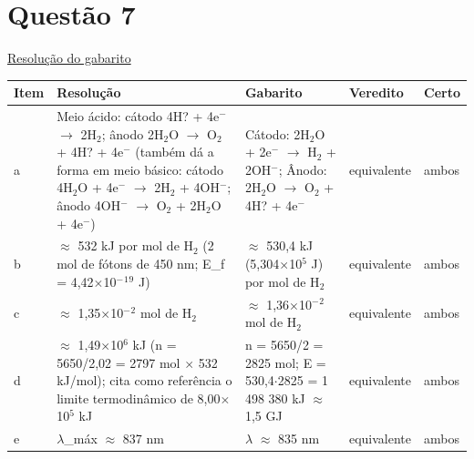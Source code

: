 \documentclass{article}%
\begin{document}
\section*{Questão 7}%
\href{https://poliedroresolve.sistemapoliedro.com.br/vestibulares/ita/2026/ita-2-fase-dia-2-29-10-2025-2-fase-dia-2/dissertativa-7-quimica-2-fase-dia-2-ita-2026}{Resolução do gabarito}\par\smallskip%
\begin{longtable}{@{}p{} p{} p{} p{} p{}@{}}\toprule Item & Resolução & Gabarito & Veredito & Certo \\ \midrule
a & Meio ácido: cátodo 4H? + 4e$^{-}$ $\to$ 2H$_{2}$; ânodo 2H$_{2}$O $\to$ O$_{2}$ + 4H? + 4e$^{-}$ (também dá a forma em meio básico: cátodo 4H$_{2}$O + 4e$^{-}$ $\to$ 2H$_{2}$ + 4OH$^{-}$; ânodo 4OH$^{-}$ $\to$ O$_{2}$ + 2H$_{2}$O + 4e$^{-}$) & Cátodo: 2H$_{2}$O + 2e$^{-}$ $\to$ H$_{2}$ + 2OH$^{-}$; Ânodo: 2H$_{2}$O $\to$ O$_{2}$ + 4H? + 4e$^{-}$ & equivalente & ambos \\
b & $\approx$ 532 kJ por mol de H$_{2}$ (2 mol de fótons de 450 nm; E\_f = 4,42$\times$10$^{-}$$^{1}$$^{9}$ J) & $\approx$ 530,4 kJ (5,304$\times$10$^{5}$ J) por mol de H$_{2}$ & equivalente & ambos \\
c & $\approx$ 1,35$\times$10$^{-}$$^2$ mol de H$_{2}$ & $\approx$ 1,36$\times$10$^{-}$$^2$ mol de H$_{2}$ & equivalente & ambos \\
d & $\approx$ 1,49$\times$10$^{6}$ kJ (n = 5650/2,02 = 2797 mol $\times$ 532 kJ/mol); cita como referência o limite termodinâmico de 8,00$\times$10$^{5}$ kJ & n = 5650/2 = 2825 mol; E = 530,4$\cdot$2825 = 1 498 380 kJ $\approx$ 1,5 GJ & equivalente & ambos \\
e & $\lambda$\_máx $\approx$ 837 nm & $\lambda$ $\approx$ 835 nm & equivalente & ambos \\
\bottomrule\end{longtable}%
\end{document}
